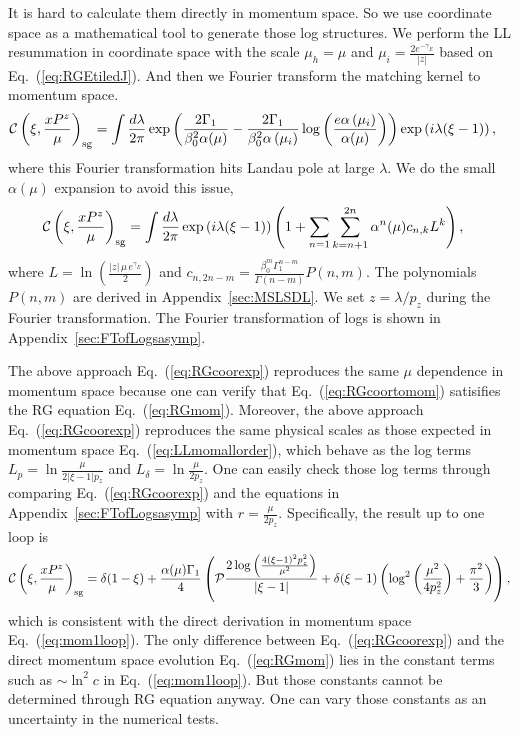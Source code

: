 \documentclass[a4paper,11pt]{article}
\begin{document}
It is hard to calculate them directly in momentum space. So we use coordinate space as a mathematical tool to generate those log structures. We perform the LL resummation in coordinate space with the scale $\mu_h=\mu$ and $\mu_i=\frac{2 e^{-\gamma_E}}{|z|}$ based on Eq.~(\ref{eq:RGEtiledJ}). And then we Fourier transform the matching kernel to momentum space.
\begin{align}\label{eq:RGcoortomom}
&{\cal C}\left(\xi,\frac{xP^z}{\mu}\right)_{\rm sg}=\int \frac{d \lambda}{2 \pi}\exp \left(\frac{2 \Gamma _1}{\beta _0^2 \alpha (\mu)} -\frac{2 \Gamma _1 }{\beta_0^2 \alpha \left(\mu _i\right)}\log \left(\frac{e \alpha \left(\mu_i\right)}{\alpha (\mu )}\right)\right) \exp \left(i \lambda (\xi-1)\right),
\end{align}
where this Fourier transformation hits Landau pole at large $\lambda$. We do the small $\alpha(\mu)$ expansion to avoid this issue,
\begin{align}\label{eq:RGcoorexp}
&{\cal C}\left(\xi,\frac{xP^z}{\mu}\right)_{\rm sg}=\int \frac{d \lambda}{2 \pi} \exp \left(i \lambda (\xi-1)\right) \left( 1 + \sum_{n=1} \sum_{k=n+1}^{2n} \alpha^{n}(\mu) c_{n,k} L^k \right),
\end{align}
where $L=\ln\left(\frac{|z| \, \mu \, e^{\gamma_E}}{2}\right)$ and $c_{n,2n-m} = \frac{\beta _0^m \Gamma _1^{n-m}}{\Gamma (n-m)} P(n,m)$. The polynomials $P(n,m)$ are derived in Appendix~\ref{sec:MSLSDL}. We set $z=\lambda/p_z$ during the Fourier transformation. The Fourier transformation of logs is shown in Appendix~\ref{sec:FTofLogsasymp}. 

The above approach Eq.~(\ref{eq:RGcoorexp}) reproduces the same $\mu$ dependence in momentum space because one can verify that Eq.~(\ref{eq:RGcoortomom}) satisifies the RG equation Eq.~(\ref{eq:RGmom}). Moreover, the above approach Eq.~(\ref{eq:RGcoorexp}) reproduces the same physical scales as those expected in momentum space Eq.~(\ref{eq:LLmomallorder}), which behave as the log terms $L_p = \ln \frac{\mu}{2|\xi-1|p_z}$ and $L_{\delta} = \ln \frac{\mu}{2p_z}$. One can easily check those log terms through comparing Eq.~(\ref{eq:RGcoorexp}) and the equations in Appendix~\ref{sec:FTofLogsasymp} with $r=\frac{\mu}{2p_z}$. Specifically, the result up to one loop is
\begin{align}
{\cal C}\left(\xi,\frac{xP^z}{\mu}\right)_{\rm sg} =\delta (1-\xi )+\frac{\alpha (\mu) \Gamma_1}{4}  \left(\mathcal{P}\frac{2  \log \left(\frac{4 (\xi -1)^2 p_z^2}{\mu^2}\right)}{\left| \xi -1\right| }+\delta (\xi -1) \left(\log^2\left(\frac{\mu ^2}{4 p_z^2}\right)+\frac{\pi^2}{3}\right)\right),
\end{align}
which is consistent with the direct derivation in momentum space Eq.~(\ref{eq:mom1loop}). The only difference between Eq.~(\ref{eq:RGcoorexp}) and the direct momentum space evolution Eq.~(\ref{eq:RGmom}) lies in the constant terms such as $\sim \ln^2 c$ in Eq.~(\ref{eq:mom1loop}). But those constants cannot be determined through RG equation anyway. One can vary those constants as an uncertainty in the numerical tests. 
\end{document}
